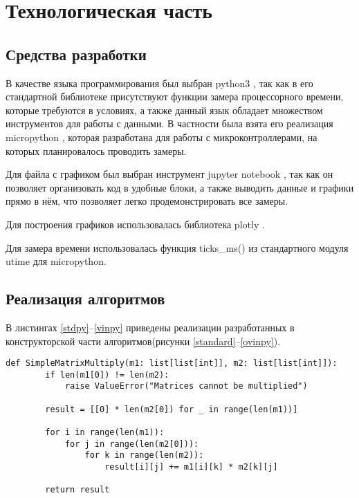 \chapter{Технологическая часть}
\section{Средства разработки}

В качестве языка программирования был выбран python3 \cite{python3}, так как в его стандартной библиотеке присутствуют функции замера процессорного времени, которые требуются в условиях, а также данный язык обладает множеством инструментов для работы с данными.
В частности была взята его реализация micropython \cite{micropython}, которая разработана для работы с микроконтроллерами, на которых планировалось проводить замеры.

Для файла с графиком был выбран инструмент jupyter notebook \cite{python3-jupyter}, так как он позволяет организовать код в удобные блоки,  а также выводить данные и графики прямо в нём, что позволяет легко продемонстрировать все замеры.

Для построения графиков использовалась библиотека plotly \cite{python3-plotly}.

Для замера времени использовалась функция ticks\_ms() из стандартного модуля utime \cite{python3-utime} для micropython.

\section{Реализация алгоритмов}

В листингах \ref{stdpy}–\ref{vinpy} приведены реализации разработанных в конструкторской части алгоритмов(рисунки \ref{standard}–\ref{ovinpy}).

\begin{lstlisting}[label=stdpy,caption={Стандартный алгоритм умножения матриц}]
	def SimpleMatrixMultiply(m1: list[list[int]], m2: list[list[int]]):
		if len(m1[0]) != len(m2):
			raise ValueError("Matrices cannot be multiplied")
		
		result = [[0] * len(m2[0]) for _ in range(len(m1))]
		
		for i in range(len(m1)):
			for j in range(len(m2[0])):
				for k in range(len(m2)):
					result[i][j] += m1[i][k] * m2[k][j]
		
		return result
\end{lstlisting}

